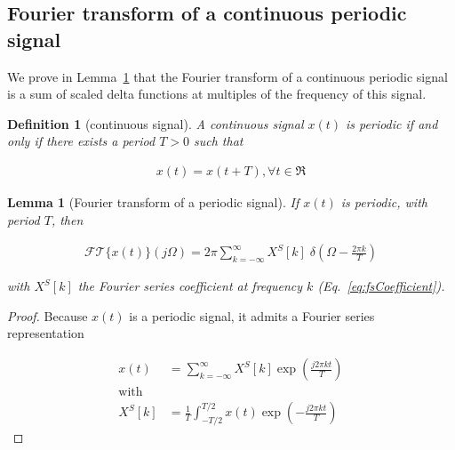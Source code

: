 \documentclass[12pt]{article}
\newtheorem{definition}{Definition}
\newtheorem{lemma}{Lemma}
\begin{document}
\begin{appendices}

\section{Fourier transform of a continuous periodic signal}
\label{sec:ftContPeriodicSignal}

    We prove in Lemma~\ref{lemma:ftContPeriodicSignal} that the Fourier
    transform of a continuous periodic signal is a sum of scaled delta
    functions at multiples of the frequency of this signal.

    \begin{definition}[continuous signal]

        A continuous signal $x(t)$ is periodic if and only if there exists
        a period $T>0$ such that

        \begin{align}
            x(t)=x(t+T), \forall t\in\Re
        \end{align}

        \label{definition:periodicSignal}
    \end{definition}

    \begin{lemma}[Fourier transform of a periodic signal]
        If $x(t)$ is periodic, with period $T$, then

        \begin{align}
            \mathcal{FT}\{x(t)\}(j\Omega)=2\pi\sum_{k=-\infty}^\infty X^S[k]\;\delta\left(\Omega-\frac{2\pi k}{T}\right)\label{eq:ftPeriodic}
         \end{align}

         \noindent with $X^S[k]$ the Fourier series coefficient at frequency $k$ (Eq.~\ref{eq:fsCoefficient}).

         \label{lemma:ftContPeriodicSignal}

    \end{lemma}

    \begin{proof}
        Because $x(t)$ is a periodic signal, it admits a Fourier series
        representation \citep[][Section 2.3]{porat97}

        \begin{align}
            x(t)&=\sum_{k=-\infty}^\infty X^S[k]\exp\left(\frac{j2\pi kt}{T}\right)\label{eq:xFourierSeries}\\
            \text{with}&\nonumber\\
            X^S[k]&=\frac{1}{T}\int_{-T/2}^{T/2}x(t)\exp\left(-\frac{j2\pi kt}{T}\right)\label{eq:fsCoefficient}
        \end{align}


\end{proof}
\end{appendices}
\end{document}
